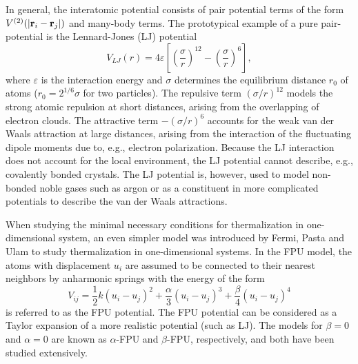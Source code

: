 In general, the interatomic potential consists of pair potential terms of the form $V^{(2)}(|\mathbf{r}_{i}-\mathbf{r}_j|)$ and many-body terms. 
The prototypical example of a pure pair-potential is the Lennard-Jones (LJ) potential
\begin{equation}
 V_{LJ}(r) = 4\varepsilon \left[\left( \frac{\sigma}{r}\right)^{12}-\left( \frac{\sigma}{r}\right)^6  \right],
\end{equation}
where $\varepsilon$ is the interaction energy and $\sigma$ determines the equilibrium distance $r_0$ of atoms ($r_0=2^{1/6}\sigma$ for two particles). The repulsive term $(\sigma/r)^{12}$ models the strong atomic repulsion at short distances, arising from the overlapping of electron clouds. The attractive term $-(\sigma/r)^{6}$ accounts for the weak van der Waals attraction at large distances, arising from the interaction of the fluctuating dipole moments due to, e.g., electron polarization. Because the LJ interaction does not account for the local environment, the LJ potential cannot describe, e.g., covalently bonded crystals. The LJ potential is, however, used to model non-bonded noble gases such as argon or as a constituent in more complicated potentials to describe the van der Waals attractions.

When studying the minimal necessary conditions for thermalization in one-dimensional system, an even simpler model was introduced by Fermi, Pasta and Ulam to study thermalization in one-dimensional systems. In the FPU model, the atoms with displacement $u_i$ are assumed to be connected to their nearest neighbors by anharmonic springs with the energy of the form
\begin{equation}
  V_{ij} = \frac{1}{2} k (u_i-u_j)^2 + \frac{\alpha}{3} (u_i-u_j)^3+ \frac{\beta}{4} (u_i-u_j)^4
\end{equation}
is referred to as the FPU potential. The FPU potential can be considered as a Taylor expansion of a more realistic potential (such as LJ). The models for $\beta=0$ and $\alpha=0$ are known as $\alpha$-FPU and $\beta$-FPU, respectively, and both have been studied extensively. 

